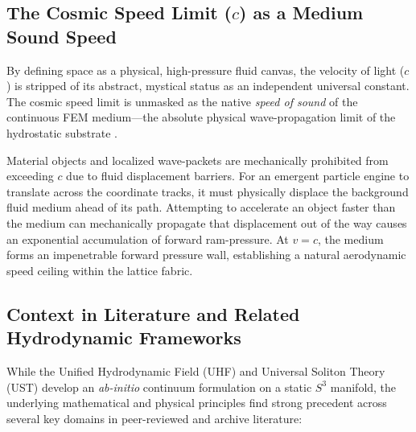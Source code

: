 \documentclass[11pt,a4paper]{article}
\begin{document}
	\subsection{\texorpdfstring{The Cosmic Speed Limit ($c$) as a Medium Sound Speed}{The Cosmic Speed Limit (c) as a Medium Sound Speed}}
	By defining space as a physical, high-pressure fluid canvas, the velocity of light ($c$) is stripped of its abstract, mystical status as an independent universal constant. The cosmic speed limit is unmasked as the native \textit{speed of sound} of the continuous FEM medium—the absolute physical wave-propagation limit of the hydrostatic substrate \cite{volovik2003, verozub2020}.
	
	Material objects and localized wave-packets are mechanically prohibited from exceeding $c$ due to fluid displacement barriers. For an emergent particle engine to translate across the coordinate tracks, it must physically displace the background fluid medium ahead of its path. Attempting to accelerate an object faster than the medium can mechanically propagate that displacement out of the way causes an exponential accumulation of forward ram-pressure. At $v = c$, the medium forms an impenetrable forward pressure wall, establishing a natural aerodynamic speed ceiling within the lattice fabric.
	
	\subsection{Context in Literature and Related Hydrodynamic Frameworks}
	While the Unified Hydrodynamic Field (UHF) and Universal Soliton Theory (UST) develop an \textit{ab-initio} continuum formulation on a static $S^3$ manifold, the underlying mathematical and physical principles find strong precedent across several key domains in peer-reviewed and archive literature:
	
\end{document}
